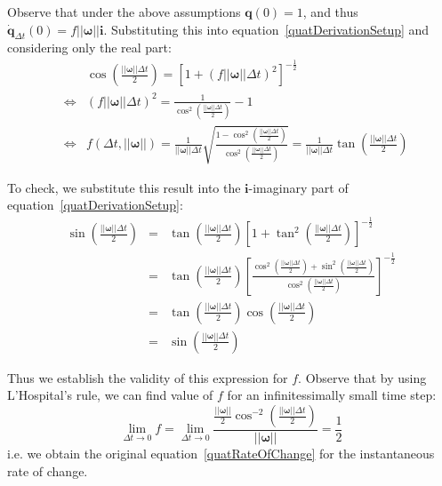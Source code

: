 Observe that under the above assumptions $\mathbf{q}(0) = 1$, and thus
$\dot{\mathbf{q}}_{\Delta t}(0) = f ||\bm{\omega}|| \mathbf{i}$. Substituting this
into equation~\ref{quatDerivationSetup} and considering only the real part:
\begin{eqnarray*}
&& \cos\left(\frac{||\bm{\omega}||\Delta t}{2}\right) =
    \left[1 + \left( f ||\bm{\omega}||\Delta t \right)^2 \right]^{-\frac{1}{2}} \\
&\Leftrightarrow&
    \left( f ||\bm{\omega}||\Delta t \right)^2 =
    \frac{1}{\cos^2\left(\frac{||\bm{\omega}||\Delta t}{2}\right)} - 1 \\
&\Leftrightarrow&
    f(\Delta t, ||\bm{\omega}||) =
    \frac{1}{||\bm{\omega}||\Delta t} \sqrt{\frac{
        1 - \cos^2\left(\frac{||\bm{\omega}||\Delta t}{2}\right)}{
        \cos^2\left(\frac{||\bm{\omega}||\Delta t}{2}\right)}} =
    \frac{1}{||\bm{\omega}||\Delta t}
        \tan\left(\frac{||\bm{\omega}||\Delta t}{2}\right)
\end{eqnarray*}

To check, we substitute this result into the $\mathbf{i}$-imaginary part of
equation~\ref{quatDerivationSetup}:
\begin{eqnarray*}
\sin\left(\frac{||\bm{\omega}||\Delta t}{2}\right) & = &
    \tan\left(\frac{||\bm{\omega}||\Delta t}{2}\right)
    \left[ 1 + \tan^2\left(\frac{||\bm{\omega}||\Delta t}{2}\right)
    \right]^{-\frac{1}{2}} \\
&=& \tan\left(\frac{||\bm{\omega}||\Delta t}{2}\right)
    \left[ \frac{\cos^2\left(\frac{||\bm{\omega}||\Delta t}{2}\right) +
    \sin^2\left(\frac{||\bm{\omega}||\Delta t}{2}\right) }{
    \cos^2\left(\frac{||\bm{\omega}||\Delta t}{2}\right) }
    \right]^{-\frac{1}{2}} \\
&=& \tan\left(\frac{||\bm{\omega}||\Delta t}{2}\right)
    \cos\left(\frac{||\bm{\omega}||\Delta t}{2}\right) \\
&=& \sin\left(\frac{||\bm{\omega}||\Delta t}{2}\right)
\end{eqnarray*}

Thus we establish the validity of this expression for $f$. Observe that by using 
L'Hospital's rule, we can find value of $f$ for an infinitessimally small time step:
$$
\lim_{\Delta t \to 0} f = \lim_{\Delta t \to 0} \frac{ \frac{||\bm{\omega}||}{2}
    \cos^{-2}\left(\frac{||\bm{\omega}||\Delta t}{2}\right) }{ ||\bm{\omega}|| } =
    \frac{1}{2}
$$
i.e. we obtain the original equation~\ref{quatRateOfChange} for the
instantaneous rate of change.

